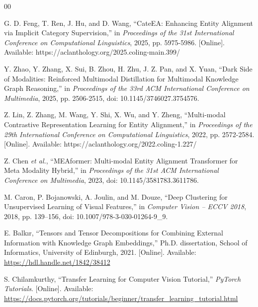 \begin{thebibliography}{00}

G. D. Feng, T. Ren, J. Hu, and D. Wang,
``CateEA: Enhancing Entity Alignment via Implicit Category Supervision,''
in \textit{Proceedings of the 31st International Conference on Computational Linguistics},
2025, pp. 5975-5986.
[Online]. Available: https://aclanthology.org/2025.coling-main.399/

Y. Zhao, Y. Zhang, X. Sui, B. Zhou, H. Zhu, J. Z. Pan, and X. Yuan,
``Dark Side of Modalities: Reinforced Multimodal Distillation for Multimodal Knowledge Graph Reasoning,''
in \textit{Proceedings of the 33rd ACM International Conference on Multimedia},
2025, pp. 2506-2515,
doi: 10.1145/3746027.3754576.

Z. Lin, Z. Zhang, M. Wang, Y. Shi, X. Wu, and Y. Zheng,
``Multi-modal Contrastive Representation Learning for Entity Alignment,''
in \textit{Proceedings of the 29th International Conference on Computational Linguistics},
2022, pp. 2572-2584.
[Online]. Available: https://aclanthology.org/2022.coling-1.227/

Z. Chen \textit{et al.},
``MEAformer: Multi-modal Entity Alignment Transformer for Meta Modality Hybrid,''
in \textit{Proceedings of the 31st ACM International Conference on Multimedia},
2023, doi: 10.1145/3581783.3611786.

M. Caron, P. Bojanowski, A. Joulin, and M. Douze,
``Deep Clustering for Unsupervised Learning of Visual Features,''
in \textit{Computer Vision -- ECCV 2018},
2018, pp. 139--156,
doi: 10.1007/978-3-030-01264-9\_9.


E. Balk{\i}r,
``Tensors and Tensor Decompositions for Combining
External Information with Knowledge Graph Embeddings,''
Ph.D. dissertation, School of Informatics,
University of Edinburgh, 2021.
[Online]. Available:
\url{https://hdl.handle.net/1842/38412}


S. Chilamkurthy,
``Transfer Learning for Computer Vision Tutorial,''
\textit{PyTorch Tutorials}.
[Online]. Available:
\url{https://docs.pytorch.org/tutorials/beginner/transfer_learning_tutorial.html}

\end{thebibliography}